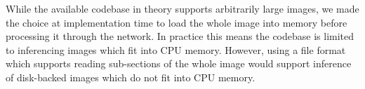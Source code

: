 \documentclass[letterpaper]{article} %
\begin{document}
While the available codebase in theory supports arbitrarily large images, we made the choice at implementation time to load the whole image into memory before processing it through the network. In practice this means the codebase is limited to inferencing images which fit into CPU memory. However, using a file format which supports reading sub-sections of the whole image would support inference of disk-backed images which do not fit into CPU memory. 


%



{\fontsize{9.0pt}{10.0pt} 
\selectfont


}
\end{document}
